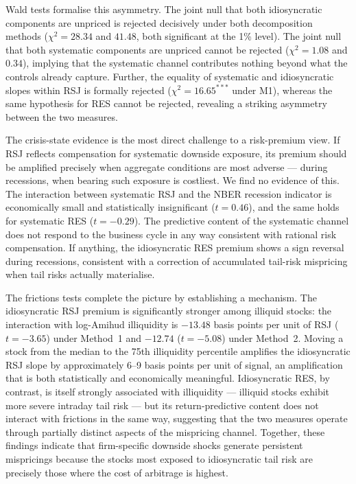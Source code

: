 \documentclass[11pt,a4paper]{article}
\begin{document}
Wald tests formalise this asymmetry. The joint null that both idiosyncratic components
are unpriced is rejected decisively under both decomposition methods ($\chi^2 = 28.34$
and $41.48$, both significant at the 1\% level). The joint null that both systematic
components are unpriced cannot be rejected ($\chi^2 = 1.08$ and $0.34$), implying that
the systematic channel contributes nothing beyond what the controls already capture.
Further, the equality of systematic and idiosyncratic slopes within RSJ is formally
rejected ($\chi^2 = 16.65^{***}$ under M1), whereas the same hypothesis for RES cannot
be rejected, revealing a striking asymmetry between the two measures.

The crisis-state evidence is the most direct challenge to a risk-premium view. If RSJ
reflects compensation for systematic downside exposure, its premium should be amplified
precisely when aggregate conditions are most adverse --- during recessions, when bearing
such exposure is costliest. We find no evidence of this. The interaction between
systematic RSJ and the NBER recession indicator is economically small and statistically
insignificant ($t = 0.46$), and the same holds for systematic RES ($t = -0.29$). The
predictive content of the systematic channel does not respond to the business cycle in
any way consistent with rational risk compensation. If anything, the idiosyncratic RES
premium shows a sign reversal during recessions, consistent with a correction of
accumulated tail-risk mispricing when tail risks actually materialise.

The frictions tests complete the picture by establishing a mechanism. The idiosyncratic
RSJ premium is significantly stronger among illiquid stocks: the interaction with
log-Amihud illiquidity is $-13.48$ basis points per unit of RSJ ($t = -3.65$) under
Method~1 and $-12.74$ ($t = -5.08$) under Method~2. Moving a stock from the median to
the 75th illiquidity percentile amplifies the idiosyncratic RSJ slope by approximately
6--9 basis points per unit of signal, an amplification that is both statistically and
economically meaningful. Idiosyncratic RES, by contrast, is itself strongly associated
with illiquidity --- illiquid stocks exhibit more severe intraday tail risk --- but its
return-predictive content does not interact with frictions in the same way, suggesting
that the two measures operate through partially distinct aspects of the mispricing
channel. Together, these findings indicate that firm-specific downside shocks generate
persistent mispricings because the stocks most exposed to idiosyncratic tail risk are
precisely those where the cost of arbitrage is highest.
\end{document}
